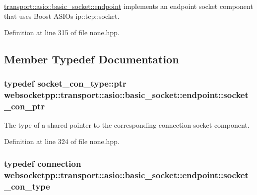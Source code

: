\hyperlink{classwebsocketpp_1_1transport_1_1asio_1_1basic__socket_1_1endpoint}{transport\+::asio\+::basic\+\_\+socket\+::endpoint} implements an endpoint socket component that uses Boost A\+S\+I\+O\textquotesingle{}s ip\+::tcp\+::socket. 

Definition at line 315 of file none.\+hpp.



\subsection{Member Typedef Documentation}
\hypertarget{classwebsocketpp_1_1transport_1_1asio_1_1basic__socket_1_1endpoint_afe9d86dd3fe9e8c73087f22daafcd70c}{}
\subsubsection[{socket\+\_\+con\+\_\+ptr}]{\setlength{\rightskip}{0pt plus 5cm}typedef {\bf socket\+\_\+con\+\_\+type\+::ptr} {\bf websocketpp\+::transport\+::asio\+::basic\+\_\+socket\+::endpoint\+::socket\+\_\+con\+\_\+ptr}}\label{classwebsocketpp_1_1transport_1_1asio_1_1basic__socket_1_1endpoint_afe9d86dd3fe9e8c73087f22daafcd70c}
The type of a shared pointer to the corresponding connection socket component. 

Definition at line 324 of file none.\+hpp.

\hypertarget{classwebsocketpp_1_1transport_1_1asio_1_1basic__socket_1_1endpoint_adbc0e16b7e4aa0ba76ef46378d0c9e5f}{}
\subsubsection[{socket\+\_\+con\+\_\+type}]{\setlength{\rightskip}{0pt plus 5cm}typedef {\bf connection} {\bf websocketpp\+::transport\+::asio\+::basic\+\_\+socket\+::endpoint\+::socket\+\_\+con\+\_\+type}}\label{classwebsocketpp_1_1transport_1_1asio_1_1basic__socket_1_1endpoint_adbc0e16b7e4aa0ba76ef46378d0c9e5f}


